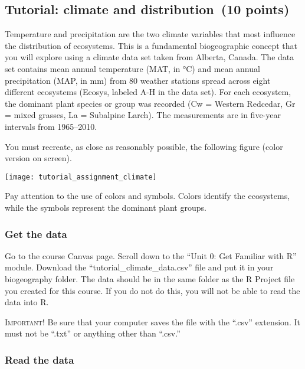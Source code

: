 \documentclass[11pt]{article}
\newcommand{\assignmentTitle}{Tutorial: climate and distribution}
\begin{document}
	\thispagestyle{firstpage}
	
	\subsection*{\assignmentTitle\ (10 points)}
	
	Temperature and precipitation are the two climate variables that most
	influence the distribution of ecosystems. This is a fundamental
	biogeographic concept that you will explore using a climate data set
	taken from Alberta, Canada. The data set contains mean annual
	temperature (MAT, in °C) and mean annual precipitation (MAP, in mm) from
	80 weather stations spread across eight different ecosystems (Ecosys,
	labeled A-H in the data set). For each ecosystem, the dominant plant species or group
	was recorded (Cw = Western Redcedar, Gr = mixed grasses, La = Subalpine
	Larch). The measurements are in five-year intervals from 1965--2010.
	
	You must recreate, as close as reasonably possible, the following figure
	(color version on screen).
	
	\begin{center}
		\texttt{[image: tutorial\_assignment\_climate]}
	\end{center}
	
	Pay attention to the use of colors and symbols. Colors identify the
	ecosystems, while the symbols represent the dominant plant groups.
	
	\subsubsection*{Get the data}
	
	Go to the course Canvas page. Scroll down to the “Unit 0: Get Familiar with R” module. Download the “tutorial\_climate\_data.csv” file and put it in your biogeography folder. The data should be in the same folder as the R Project file you created for this course. If you do not do this, you will not be able to read the data into R.
	
	 \textsc{Important!} Be sure that your computer saves the file with the “.csv” extension. It must not be “.txt” or anything other than “.csv.”
	
	
	
	\subsubsection*{Read the data}
	
\end{document}
